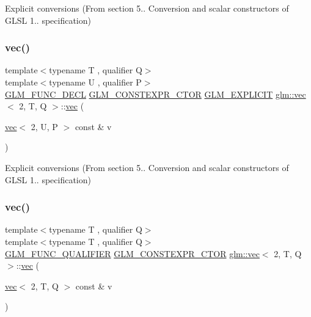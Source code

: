 Explicit conversions (From section 5.. Conversion and scalar constructors of G\+L\+SL 1.. specification) 

\mbox{\label{structglm_1_1vec_3_012_00_01_t_00_01_q_01_4_a55d77d8b7320875815bfe34fd59823af}} 
\subsubsection{\texorpdfstring{vec()}{vec()}\hspace{0.1cm}{\footnotesize\ttfamily [10/17]}}
{\footnotesize\ttfamily template$<$typename T , qualifier Q$>$ \\
template$<$typename U , qualifier P$>$ \\
\hyperlink{setup_8hpp_ab2d052de21a70539923e9bcbf6e83a51}{G\+L\+M\+\_\+\+F\+U\+N\+C\+\_\+\+D\+E\+CL} \hyperlink{setup_8hpp_ad34178a09666081abdb573c14d1f4a5a}{G\+L\+M\+\_\+\+C\+O\+N\+S\+T\+E\+X\+P\+R\+\_\+\+C\+T\+OR} \hyperlink{setup_8hpp_a6c74f5a5e7b134ab69023ff9a30d4d5d}{G\+L\+M\+\_\+\+E\+X\+P\+L\+I\+C\+IT} \hyperlink{structglm_1_1vec}{glm\+::vec}$<$ 2, T, Q $>$\+::\hyperlink{structglm_1_1vec}{vec} (\begin{DoxyParamCaption}\item[{\hyperlink{structglm_1_1vec}{vec}$<$ 2, U, P $>$ const \&}]{v }\end{DoxyParamCaption})}



Explicit conversions (From section 5.. Conversion and scalar constructors of G\+L\+SL 1.. specification) 

\mbox{\label{structglm_1_1vec_3_012_00_01_t_00_01_q_01_4_a1dc70d40254a106cf1589d2fb91cadf8}} 
\subsubsection{\texorpdfstring{vec()}{vec()}\hspace{0.1cm}{\footnotesize\ttfamily [11/17]}}
{\footnotesize\ttfamily template$<$typename T , qualifier Q$>$ \\
template$<$typename T , qualifier Q$>$ \\
\hyperlink{setup_8hpp_a33fdea6f91c5f834105f7415e2a64407}{G\+L\+M\+\_\+\+F\+U\+N\+C\+\_\+\+Q\+U\+A\+L\+I\+F\+I\+ER} \hyperlink{setup_8hpp_ad34178a09666081abdb573c14d1f4a5a}{G\+L\+M\+\_\+\+C\+O\+N\+S\+T\+E\+X\+P\+R\+\_\+\+C\+T\+OR} \hyperlink{structglm_1_1vec}{glm\+::vec}$<$ 2, T, Q $>$\+::\hyperlink{structglm_1_1vec}{vec} (\begin{DoxyParamCaption}\item[{\hyperlink{structglm_1_1vec}{vec}$<$ 2, T, Q $>$ const \&}]{v }\end{DoxyParamCaption})}



